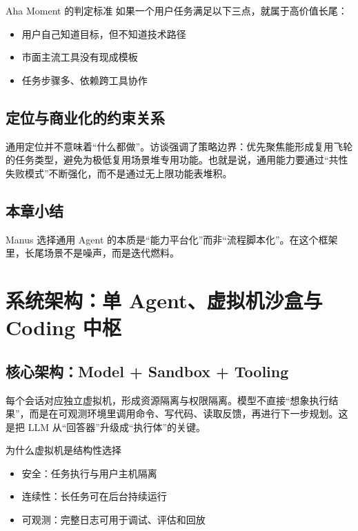 \documentclass[a4paper]{article}
\begin{document}
\begin{importantbox}{Aha Moment 的判定标准}
如果一个用户任务满足以下三点，就属于高价值长尾：
\begin{itemize}
    \item 用户自己知道目标，但不知道技术路径
    \item 市面主流工具没有现成模板
    \item 任务步骤多、依赖跨工具协作
\end{itemize}
\end{importantbox}

\subsection{定位与商业化的约束关系}

通用定位并不意味着“什么都做”。访谈强调了策略边界：优先聚焦能形成复用飞轮的任务类型，避免为极低复用场景堆专用功能。也就是说，通用能力要通过“共性失败模式”不断强化，而不是通过无上限功能表堆积。

\subsection{本章小结}

Manus 选择通用 Agent 的本质是“能力平台化”而非“流程脚本化”。在这个框架里，长尾场景不是噪声，而是迭代燃料。


\section{系统架构：单 Agent、虚拟机沙盒与 Coding 中枢}

\subsection{核心架构：Model + Sandbox + Tooling}

每个会话对应独立虚拟机，形成资源隔离与权限隔离。模型不直接“想象执行结果”，而是在可观测环境里调用命令、写代码、读取反馈，再进行下一步规划。这是把 LLM 从“回答器”升级成“执行体”的关键。

\begin{importantbox}{为什么虚拟机是结构性选择}
\begin{itemize}
    \item 安全：任务执行与用户主机隔离
    \item 连续性：长任务可在后台持续运行
    \item 可观测：完整日志可用于调试、评估和回放
\end{itemize}
\end{importantbox}
\end{document}

